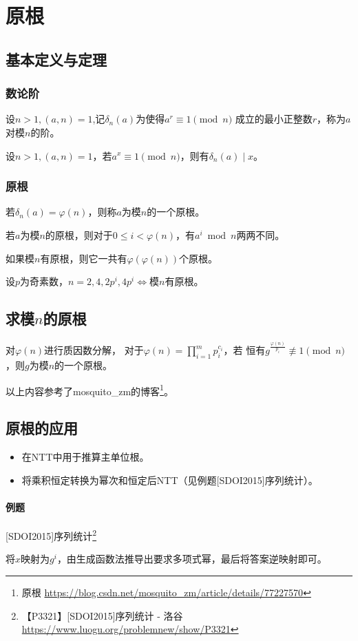 \section{原根}\label{PrimitiveRoot}
\subsection{基本定义与定理}
\subsubsection{数论阶}
设$n>1,(a,n)=1$,记$\delta_n(a)$为使得$a^r\equiv 1 \pmod{n}$
成立的最小正整数$r$，称为$a$对模$n$的阶。

\begin{theorem}
	设$n>1,(a,n)=1$，若$a^x\equiv 1 \pmod{n}$，则有$\delta_n(a)\mid x$。
\end{theorem}

\subsubsection{原根}
若$\delta_n(a)=\varphi(n)$，则称$a$为模$n$的一个原根。

若$a$为模$n$的原根，则对于$0\leq i< \varphi(n)$，有$a^i\bmod{n}$两两不同。

\begin{theorem}
	如果模$n$有原根，则它一共有$\varphi(\varphi(n))$个原根。
\end{theorem}

\begin{theorem}
	设$p$为奇素数，$n=2,4,2p^i,4p^i\Leftrightarrow$模$n$有原根。
\end{theorem}

\subsection{求模$n$的原根}

对$\varphi(n)$进行质因数分解，
对于$\displaystyle \varphi(n)=\prod_{i=1}^m{p_i^{c_i}}$，若
恒有$g^\frac{\varphi(n)}{p_i}\not\equiv 1 \pmod{n}$，则$g$为模$n$的一个原根。

以上内容参考了mosquito\_zm的博客\footnote{原根
	\url{https://blog.csdn.net/mosquito\_zm/article/details/77227570}}。
\subsection{原根的应用}
\begin{itemize}
	\item 在NTT中用于推算主单位根。
	\item 将乘积恒定转换为幂次和恒定后NTT（见例题[SDOI2015]序列统计）。
\end{itemize}
\paragraph{例题} [SDOI2015]序列统计\footnote{【P3321】[SDOI2015]序列统计 - 洛谷
\url{https://www.luogu.org/problemnew/show/P3321}}

将$x$映射为$g^i$，由生成函数法推导出要求多项式幂，最后将答案逆映射即可。


